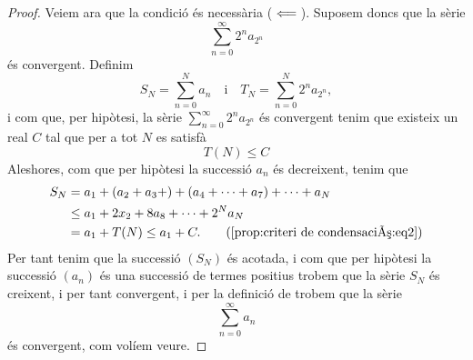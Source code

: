 \documentclass[../Apunts.tex]{subfiles}
\begin{document}
\begin{proposition}
\begin{proof}
			Veiem ara que la condició és necessària (\(\impliedby\)). Suposem doncs que la sèrie
			\[\sum_{n=0}^{\infty}2^{n}a_{2^{n}}\]
			és convergent. Definim
			\[S_{N}=\sum_{n=0}^{N}a_{n}\quad\text{i}\quad T_{N}=\sum_{n=0}^{N}2^{n}a_{2^{n}},\]
			i com que, per hipòtesi, la sèrie \(\sum_{n=0}^{\infty}2^{n}a_{2^{n}}\) és convergent tenim que existeix un real \(C\) tal que per a tot \(N\) es satisfà
			\begin{equation}
				\label{prop:criteri de condensació:eq2}
				T(N)\leq C
			\end{equation}
			Aleshores, com que per hipòtesi la successió \(a_{n}\) és decreixent, tenim que
			\begin{align*}
				S_{N}&=a_{1}+(a_{2}+a_{3}+)+(a_{4}+\dots+a_{7})+\dots+a_{N} \\
				&\leq a_{1}+2x_{2}+8a_{8}+\dots+2^{N}a_{N} \\
				&=a_{1}+T(N)\leq a_{1}+C.\tag{\ref{prop:criteri de condensació:eq2}}
			\end{align*}
			Per tant tenim que la successió \((S_{N})\) és acotada, i com que per hipòtesi la successió \((a_{n})\) és una successió de termes positius trobem que la sèrie \(S_{N}\) és creixent, i per tant convergent, %
			i per la definició de  trobem que la sèrie
			\[\sum_{n=0}^{\infty}a_{n}\]
			és convergent, com volíem veure.
		\end{proof}
	\end{proposition}
\end{document}
